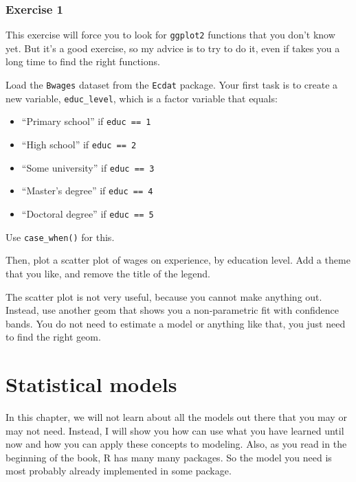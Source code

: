 \documentclass[]{gitbook}
\providecommand{\tightlist}{%
  \setlength{\itemsep}{0pt}\setlength{\parskip}{0pt}}
\theoremstyle{definition}
\theoremstyle{definition}
\theoremstyle{definition}
\theoremstyle{remark}
\begin{document}
\hypertarget{exercise-1-3}{%
\subsubsection*{Exercise 1}\label{exercise-1-3}}

This exercise will force you to look for \texttt{ggplot2} functions that
you don't know yet. But it's a good exercise, so my advice is to try to
do it, even if takes you a long time to find the right functions.

Load the \texttt{Bwages} dataset from the \texttt{Ecdat} package. Your
first task is to create a new variable, \texttt{educ\_level}, which is a
factor variable that equals:

\begin{itemize}
\tightlist
\item
  ``Primary school'' if \texttt{educ\ ==\ 1}
\item
  ``High school'' if \texttt{educ\ ==\ 2}
\item
  ``Some university'' if \texttt{educ\ ==\ 3}
\item
  ``Master's degree'' if \texttt{educ\ ==\ 4}
\item
  ``Doctoral degree'' if \texttt{educ\ ==\ 5}
\end{itemize}

Use \texttt{case\_when()} for this.

Then, plot a scatter plot of wages on experience, by education level.
Add a theme that you like, and remove the title of the legend.

The scatter plot is not very useful, because you cannot make anything
out. Instead, use another geom that shows you a non-parametric fit with
confidence bands. You do not need to estimate a model or anything like
that, you just need to find the right geom.

\hypertarget{statistical-models}{%
\section{Statistical models}\label{statistical-models}}

In this chapter, we will not learn about all the models out there that
you may or may not need. Instead, I will show you how can use what you
have learned until now and how you can apply these concepts to modeling.
Also, as you read in the beginning of the book, R has many many
packages. So the model you need is most probably already implemented in
some package.
\end{document}
